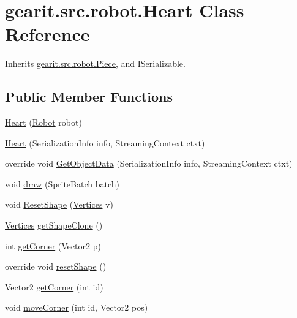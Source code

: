 \hypertarget{classgearit_1_1src_1_1robot_1_1_heart}{\section{gearit.\+src.\+robot.\+Heart Class Reference}
\label{classgearit_1_1src_1_1robot_1_1_heart}
}


Inherits \hyperlink{classgearit_1_1src_1_1robot_1_1_piece}{gearit.\+src.\+robot.\+Piece}, and I\+Serializable.

\subsection*{Public Member Functions}
\begin{DoxyCompactItemize}
\item 
\hyperlink{classgearit_1_1src_1_1robot_1_1_heart_aae8fe1f5a851e312671c388d85e2cdef}{Heart} (\hyperlink{classgearit_1_1src_1_1robot_1_1_robot}{Robot} robot)
\item 
\hyperlink{classgearit_1_1src_1_1robot_1_1_heart_abbf2e83bed0507a0f46df9c858ac920f}{Heart} (Serialization\+Info info, Streaming\+Context ctxt)
\item 
override void \hyperlink{classgearit_1_1src_1_1robot_1_1_heart_a7c08e07bed9647315d5a409823344044}{Get\+Object\+Data} (Serialization\+Info info, Streaming\+Context ctxt)
\item 
void \hyperlink{classgearit_1_1src_1_1robot_1_1_heart_af830f0dedfd8ce3db43a9ef74bda6143}{draw} (Sprite\+Batch batch)
\item 
void \hyperlink{classgearit_1_1src_1_1robot_1_1_heart_afc6baa8cc3cf66e8a1768f10ab0761e0}{Reset\+Shape} (\hyperlink{class_farseer_physics_1_1_common_1_1_vertices}{Vertices} v)
\item 
\hyperlink{class_farseer_physics_1_1_common_1_1_vertices}{Vertices} \hyperlink{classgearit_1_1src_1_1robot_1_1_heart_aefa7cf672e4df884308cfdf217f0ddd6}{get\+Shape\+Clone} ()
\item 
int \hyperlink{classgearit_1_1src_1_1robot_1_1_heart_a649572e721893c41c5a2fc897bf1cfeb}{get\+Corner} (Vector2 p)
\item 
override void \hyperlink{classgearit_1_1src_1_1robot_1_1_heart_a5555d8f8aadbbf5e193d06ab3a51b26d}{reset\+Shape} ()
\item 
Vector2 \hyperlink{classgearit_1_1src_1_1robot_1_1_heart_a49374d9684d5b1a379145f64e010eea6}{get\+Corner} (int id)
\item 
void \hyperlink{classgearit_1_1src_1_1robot_1_1_heart_aeca15387a267b45af8665256602ed3f3}{move\+Corner} (int id, Vector2 pos)

\end{DoxyCompactItemize}
